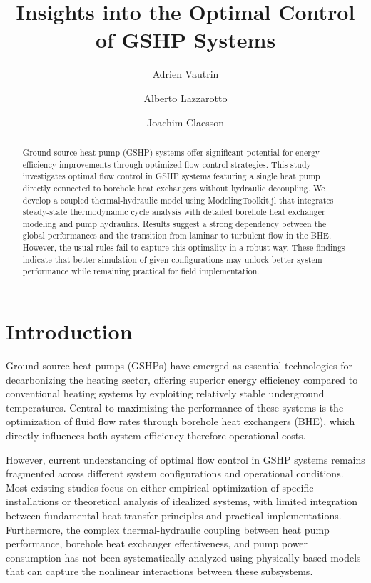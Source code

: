 \documentclass[journal=iecr,manuscript=]{achemso}
\author{Adrien Vautrin}
\affiliation{ KTH - Royal Institute of Technology,  }
\author{Alberto Lazzarotto}
\affiliation{ KTH - Royal Institute of Technology,  }
\author{Joachim Claesson}
\affiliation{ KTH - Royal Institute of Technology,  }
\title[]{Insights into the Optimal Control of GSHP Systems}
\begin{document}
\maketitle
\begin{abstract}
Ground source heat pump (GSHP) systems offer significant potential for
energy efficiency improvements through optimized flow control
strategies. This study investigates optimal flow control in GSHP systems
featuring a single heat pump directly connected to borehole heat
exchangers without hydraulic decoupling. We develop a coupled
thermal-hydraulic model using ModelingToolkit.jl that integrates
steady-state thermodynamic cycle analysis with detailed borehole heat
exchanger modeling and pump hydraulics. Results suggest a strong
dependency between the global performances and the transition from
laminar to turbulent flow in the BHE. However, the usual rules fail to
capture this optimality in a robust way. These findings indicate that
better simulation of given configurations may unlock better system
performance while remaining practical for field implementation.
\end{abstract}


\section{Introduction}\label{introduction}

Ground source heat pumps (GSHPs) have emerged as essential technologies
for decarbonizing the heating sector, offering superior energy
efficiency compared to conventional heating systems by exploiting
relatively stable underground temperatures. Central to maximizing the
performance of these systems is the optimization of fluid flow rates
through borehole heat exchangers (BHE), which directly influences both
system efficiency therefore operational costs.

However, current understanding of optimal flow control in GSHP systems
remains fragmented across different system configurations and
operational conditions. Most existing studies focus on either empirical
optimization of specific installations or theoretical analysis of
idealized systems, with limited integration between fundamental heat
transfer principles and practical implementations. Furthermore, the
complex thermal-hydraulic coupling between heat pump performance,
borehole heat exchanger effectiveness, and pump power consumption has
not been systematically analyzed using physically-based models that can
capture the nonlinear interactions between these subsystems.
\end{document}
